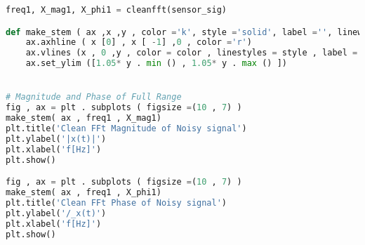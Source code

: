 \documentclass[12pt]{report}
\begin{document}
\begin{lstlisting}[language=Python]
freq1, X_mag1, X_phi1 = cleanfft(sensor_sig)

def make_stem ( ax ,x ,y , color ='k', style ='solid', label ='', linewidths =2.5 ,** kwargs ) :
    ax.axhline ( x [0] , x [ -1] ,0 , color ='r')
    ax.vlines (x , 0 ,y , color = color , linestyles = style , label = label , linewidths = linewidths )
    ax.set_ylim ([1.05* y . min () , 1.05* y . max () ])


# Magnitude and Phase of Full Range
fig , ax = plt . subplots ( figsize =(10 , 7) )
make_stem( ax , freq1 , X_mag1)
plt.title('Clean FFt Magnitude of Noisy signal')
plt.ylabel('|x(t)|')
plt.xlabel('f[Hz]')
plt.show()

fig , ax = plt . subplots ( figsize =(10 , 7) )
make_stem( ax , freq1 , X_phi1)
plt.title('Clean FFt Phase of Noisy signal')
plt.ylabel('/_x(t)')
plt.xlabel('f[Hz]')
plt.show()
\end{lstlisting}
\end{document}
